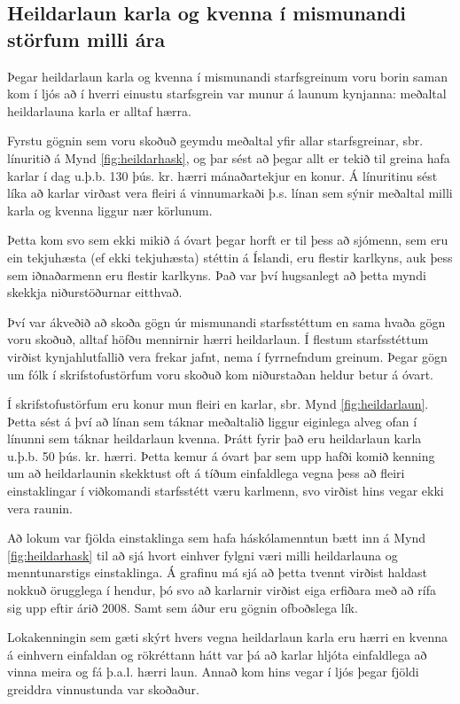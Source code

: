 \subsection{Heildarlaun karla og kvenna í mismunandi störfum milli ára}
Þegar heildarlaun karla og kvenna í mismunandi starfsgreinum voru borin saman kom í ljós að í hverri einustu starfsgrein var munur á launum kynjanna: meðaltal heildarlauna karla er alltaf hærra.

Fyrstu gögnin sem voru skoðuð geymdu meðaltal yfir allar starfsgreinar, sbr. línuritið á Mynd \ref{fig:heildarhask}, og þar sést að þegar allt er tekið til greina hafa karlar í dag u.þ.b. 130 þús. kr. hærri mánaðartekjur en konur. Á línuritinu sést líka að karlar virðast vera fleiri á vinnumarkaði þ.s. línan sem sýnir meðaltal milli karla og kvenna liggur nær körlunum.

Þetta kom svo sem ekki mikið á óvart þegar horft er til þess að sjómenn, sem eru ein tekjuhæsta (ef ekki tekjuhæsta) stéttin á Íslandi, eru flestir karlkyns, auk þess sem iðnaðarmenn eru flestir karlkyns. 
Það var því hugsanlegt að þetta myndi skekkja niðurstöðurnar eitthvað.

Því var ákveðið að skoða gögn úr mismunandi starfsstéttum en sama hvaða gögn voru skoðuð, alltaf höfðu mennirnir hærri heildarlaun. Í flestum starfsstéttum virðist kynjahlutfallið vera frekar jafnt, nema í fyrrnefndum greinum. Þegar gögn um fólk í skrifstofustörfum voru skoðuð kom niðurstaðan heldur betur á óvart.

Í skrifstofustörfum eru konur mun fleiri en karlar, sbr. Mynd \ref{fig:heildarlaun}. Þetta sést á því að línan sem táknar meðaltalið liggur eiginlega alveg ofan í línunni sem táknar heildarlaun kvenna. Þrátt fyrir það eru heildarlaun karla u.þ.b. 50 þús. kr. hærri. Þetta kemur á óvart þar sem upp hafði komið kenning um að heildarlaunin skekktust oft á tíðum einfaldlega vegna þess að fleiri einstaklingar í viðkomandi starfsstétt væru karlmenn, svo virðist hins vegar ekki vera raunin.

Að lokum var fjölda einstaklinga sem hafa háskólamenntun bætt inn á Mynd \ref{fig:heildarhask} til að sjá hvort einhver fylgni væri milli heildarlauna og menntunarstigs einstaklinga. Á grafinu má sjá að þetta tvennt virðist haldast nokkuð örugglega í hendur, þó svo að karlarnir virðist eiga erfiðara með að rífa sig upp eftir árið 2008. Samt sem áður eru gögnin ofboðslega lík.

Lokakenningin sem gæti skýrt hvers vegna heildarlaun karla eru hærri en kvenna á einhvern einfaldan og rökréttann hátt var þá að karlar hljóta einfaldlega að vinna meira og fá þ.a.l. hærri laun. Annað kom hins vegar í ljós þegar fjöldi greiddra vinnustunda var skoðaður.